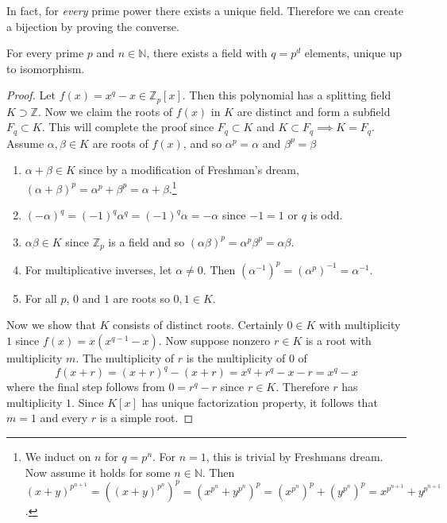   In fact, for \textit{every} prime power there exists a unique field. Therefore we can create a bijection by proving the converse. 

  \begin{theorem}
    For every prime $p$ and $n \in \mathbb{N}$, there exists a field with $q = p^d$ elements, unique up to isomorphism.  
  \end{theorem} 
  \begin{proof} 
    Let $f(x) = x^q - x \in \mathbb{Z}_p [x]$. Then this polynomial has a splitting field $K \supset \mathbb{Z}$. Now we claim the roots of $f(x)$ in $K$ are distinct and form a subfield $F_q \subset K$. This will complete the proof since $F_q \subset K$ and $K \subset F_q \implies K = F_q$. Assume $\alpha, \beta \in K$ are roots of $f(x)$, and so $\alpha^p = \alpha$ and $\beta^p = \beta$
    \begin{enumerate}
      \item $\alpha + \beta \in K$ since by a modification of Freshman's dream, $(\alpha + \beta)^p = \alpha^p + \beta^p = \alpha + \beta$.\footnote{We induct on $n$ for $q = p^n$. For $n=1$, this is trivial by Freshmans dream. Now assume it holds for some $n \in \mathbb{N}$. Then $(x + y)^{p^{n+1}} = ( (x + y)^{p^n} )^p = (x^{p^n} + y^{p^n})^p = (x^{p^n})^p + (y^{p^n})^p = x^{p^{n+1}} + y^{p^{n+1}}$. }
      \item $(-\alpha)^q = (-1)^q \alpha^q = (-1)^q \alpha = -\alpha$ since $-1 = 1$ or $q$ is odd. 
      \item $\alpha \beta \in K$ since $\mathbb{Z}_p$ is a field and so $(\alpha \beta)^p = \alpha^p \beta^p = \alpha \beta$. 
      \item For multiplicative inverses, let $\alpha \neq 0$. Then $(\alpha^{-1})^p = (\alpha^{p})^{-1} = \alpha^{-1}$. 
      \item For all $p$, $0$ and $1$ are roots so $0, 1 \in K$. 
    \end{enumerate}
    Now we show that $K$ consists of distinct roots. Certainly $0 \in K$ with multiplicity $1$ since $f(x) = x (x^{q-1} - x)$. Now suppose nonzero $r \in K$ is a root with multiplicity $m$. The multiplicity of $r$ is the multiplicity of $0$ of 
    \begin{equation}
      f(x + r) = (x + r)^q - (x + r) = x^q + r^q - x - r = x^q - x
    \end{equation}
    where the final step follows from $0 = r^q - r$ since $r \in K$. Therefore $r$ has multiplicity $1$. Since $K[x]$ has unique factorization property, it follows that $m=1$ and every $r$ is a simple root. 


\end{proof}
